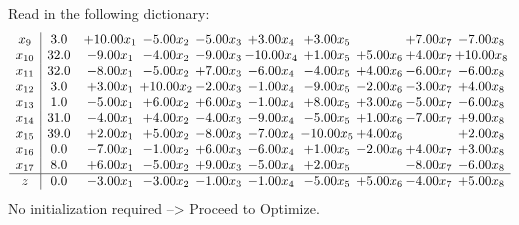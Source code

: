 \documentclass[9pt]{article}
\begin{document}
Read in the following dictionary:
\[\begin{array}{c| c c@{\hskip 2pt} c@{\hskip 2pt} c@{\hskip 2pt} c@{\hskip 2pt} c@{\hskip 2pt} c@{\hskip 2pt} c@{\hskip 2pt} c@{\hskip 2pt} }
 x_{9}   &  3.0 & + 10.00 x_{1} & -5.00 x_{2} & -5.00 x_{3} & +  3.00 x_{4} & +  3.00 x_{5} &   & +  7.00 x_{7} & -7.00 x_{8}\\
 x_{10}   &  32.0 & -9.00 x_{1} & -4.00 x_{2} & -9.00 x_{3} & -10.00 x_{4} & +  1.00 x_{5} & +  5.00 x_{6} & +  4.00 x_{7} & + 10.00 x_{8}\\
 x_{11}   &  32.0 & -8.00 x_{1} & -5.00 x_{2} & +  7.00 x_{3} & -6.00 x_{4} & -4.00 x_{5} & +  4.00 x_{6} & -6.00 x_{7} & -6.00 x_{8}\\
 x_{12}   &  3.0 & +  3.00 x_{1} & + 10.00 x_{2} & -2.00 x_{3} & -1.00 x_{4} & -9.00 x_{5} & -2.00 x_{6} & -3.00 x_{7} & +  4.00 x_{8}\\
 x_{13}   &  1.0 & -5.00 x_{1} & +  6.00 x_{2} & +  6.00 x_{3} & -1.00 x_{4} & +  8.00 x_{5} & +  3.00 x_{6} & -5.00 x_{7} & -6.00 x_{8}\\
 x_{14}   &  31.0 & -4.00 x_{1} & +  4.00 x_{2} & -4.00 x_{3} & -9.00 x_{4} & -5.00 x_{5} & +  1.00 x_{6} & -7.00 x_{7} & +  9.00 x_{8}\\
 x_{15}   &  39.0 & +  2.00 x_{1} & +  5.00 x_{2} & -8.00 x_{3} & -7.00 x_{4} & -10.00 x_{5} & +  4.00 x_{6} &   & +  2.00 x_{8}\\
 x_{16}   &  0.0 & -7.00 x_{1} & -1.00 x_{2} & +  6.00 x_{3} & -6.00 x_{4} & +  1.00 x_{5} & -2.00 x_{6} & +  4.00 x_{7} & +  3.00 x_{8}\\
 x_{17}   &  8.0 & +  6.00 x_{1} & -5.00 x_{2} & +  9.00 x_{3} & -5.00 x_{4} & +  2.00 x_{5} &   & -8.00 x_{7} & -6.00 x_{8}\\
\hline
z    &  0.0 & -3.00 x_{1} & -3.00 x_{2} & -1.00 x_{3} & -1.00 x_{4} & -5.00 x_{5} & +  5.00 x_{6} & -4.00 x_{7} & +  5.00 x_{8}\\
\end{array}\]
No initialization required --> Proceed to Optimize. 
\end{document}
